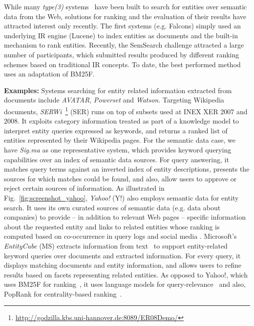 While many \emph{type(3)} systems~\cite{DBLP:journals/ijswis/ChengQ09,DBLP:journals/ws/HoganHUKPD11,DBLP:journals/ws/TummarelloCCDDD10,DBLP:journals/ws/TranWH09} have been built to search for entities over semantic data from the Web, solutions for ranking and the evaluation of their results have attracted interest only recently. The first systems (e.g. Falcons) simply used an underlying IR engine (Lucene) to index entities as documents and the built-in mechanism to rank entities. Recently, the SemSearch challenge attracted a large number of participants, which submitted results produced by different ranking schemes based on traditional IR concepts. To date, the best performed method~\cite{DBLP:conf/semweb/BlancoMV11} uses an adaptation of BM25F. 


\textbf{Examples:}
Systems searching for entity related information extracted from documents include \emph{AVATAR}, \emph{Powerset} and \emph{Watson}. Targeting Wikipedia documents, \emph{SERWi}~\footnote{\url{http://godzilla.kbs.uni-hannover.de:8089/ER08Demo/}} (SER) runs on top of subsets used at INEX XER 2007 and 2008. It exploits category information treated as part of a knowledge model to interpret entity queries expressed as keywords, and returns a ranked list of entities represented by their Wikipedia pages. For the semantic data case, we have \emph{Sig.ma} as one representative system, which provides keyword querying capabilities over an index of semantic data sources. For query answering, it matches query terms against an inverted index of entity descriptions, presents the sources for which matches could be found, and also, allow users to approve or reject certain sources of information. As illustrated in Fig.~\ref{fig:screenshot_yahoo}, \emph{Yahoo!} (Y!) also employs semantic data for entity search. It uses its own curated sources of semantic data (e.g. data about companies) to provide -- in addition to relevant Web pages -- specific information about the requested entity and links to related entities whose ranking is computed based on co-occurrence in query logs and social media \cite{vanZwol:2010:FEI:1772690.1772788}. Microsoft's \emph{EntityCube} (MS) extracts information from text~\cite{DBLP:conf/www/ZhuNLZW09} to support entity-related keyword queries over documents and extracted information. For every query, it displays matching documents and entity information, and allows users to refine results based on facets representing related entities. As opposed to Yahoo!, which uses BM25F for ranking~\cite{DBLP:conf/semweb/BlancoMV11}, it uses language models for query-relevance~\cite{DBLP:conf/www/NieMSWM07} and also, PopRank for centrality-based ranking~\cite{DBLP:conf/www/NieZWM05}. 


